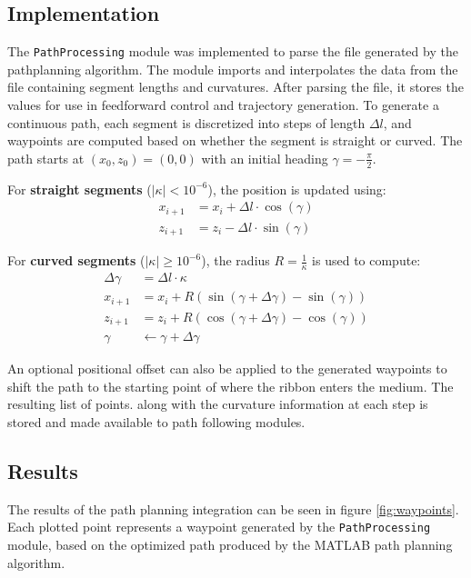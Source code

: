 \subsection{Implementation}
The \texttt{PathProcessing} module was implemented to parse the file generated by the pathplanning algorithm. The module imports and interpolates the data from the file containing segment lengths and curvatures. After parsing the file, it stores the values for use in feedforward control and trajectory generation.
\newline \newline
To generate a continuous path, each segment is discretized into steps of length \( \Delta l \), and waypoints are computed based on whether the segment is straight or curved. The path starts at \( (x_0, z_0) = (0, 0) \) with an initial heading \( \gamma = -\frac{\pi}{2} \).

For \textbf{straight segments} (\( |\kappa| < 10^{-6} \)), the position is updated using:
\begin{align}
x_{i+1} &= x_i + \Delta l \cdot \cos(\gamma) \\
z_{i+1} &= z_i - \Delta l \cdot \sin(\gamma)
\end{align}

For \textbf{curved segments} (\( |\kappa| \geq 10^{-6} \)), the radius \( R = \frac{1}{\kappa} \) is used to compute:
\begin{align}
\Delta \gamma &= \Delta l \cdot \kappa \\
x_{i+1} &= x_i + R \left( \sin(\gamma + \Delta \gamma) - \sin(\gamma) \right) \\
z_{i+1} &= z_i + R \left( \cos(\gamma + \Delta \gamma) - \cos(\gamma) \right) \\
\gamma &\leftarrow \gamma + \Delta \gamma
\end{align}

An optional positional offset can also be applied to the generated waypoints to shift the path to the starting point of where the ribbon enters the medium. The resulting list of points. along with the curvature information at each step is stored and made available to path following modules. 

\subsection{Results}
The results of the path planning integration can be seen in figure \ref{fig:waypoints}. Each plotted point represents a waypoint generated by the \texttt{PathProcessing} module, based on the optimized path produced by the MATLAB path planning algorithm.


